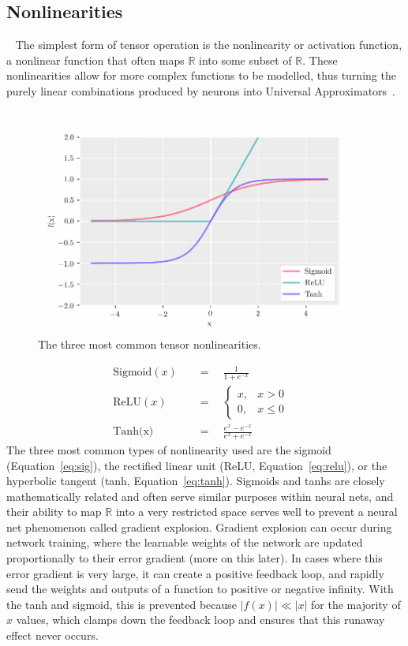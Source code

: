 \subsection{Nonlinearities}~\label{sect:nonlinearities}
The simplest form of tensor operation is the nonlinearity or activation function, a nonlinear function that often
maps $\mathbb{R}$ into some subset of $\mathbb{R}$. These nonlinearities allow for more complex functions to be modelled,
thus turning the purely linear combinations produced by neurons into Universal Approximators~\citep{stinchcombe1989}.

\begin{figure}[ht]
	\centering
	\includegraphics[width=\textwidth]{tensors/ops/nonlins.pdf}
	\caption[The three most common tensor nonlinearties]{The three most common tensor nonlinearities.}
	\label{fig:nonlins}
\end{figure}
\begin{align}
	\text{Sigmoid}(x) \quad &= \quad\frac{1}{1+e^{-x}} \label{eq:sig} &\\[5pt]
	\text{ReLU}(x)\quad &= \quad\begin{cases}
									x ,& x>0 \\
									0 ,& x\le0
	\end{cases} \label{eq:relu}&\\[4pt]
	\text{Tanh(x)} \quad &= \quad \frac{e^x - e^{-x}}{e^x + e^{-x}} \label{eq:tanh}
\end{align}
The three most common types of nonlinearity used are the sigmoid (Equation~\ref{eq:sig}), the rectified linear unit (ReLU, Equation~\ref{eq:relu}),
or the hyperbolic tangent (tanh, Equation~\ref{eq:tanh}).
Sigmoids and tanhs are closely mathematically related and often serve similar purposes within neural nets, and their ability to
map $ \mathbb{R}$ into a very restricted space serves well to prevent a neural net phenomenon called gradient explosion.
Gradient explosion can occur during network training, where the learnable weights of the network are updated proportionally
to their error gradient (more on this later). In cases where this error gradient is very large, it can create a positive
feedback loop, and rapidly send the weights and outputs of a function to positive or negative infinity. With the tanh and sigmoid,
this is prevented because $|f(x)|\ll|x|$ for the majority of $x$ values, which clamps down the feedback loop and ensures
that this runaway effect never occurs.

